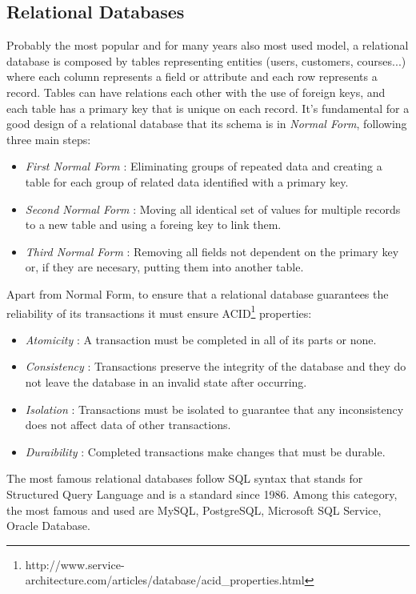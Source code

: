 \subsection{Relational Databases}
\label{sec:description}

Probably the most popular and for many years also most used model, a relational database is composed by tables representing entities (users, customers, courses...) where each column represents a field or attribute and each row represents a record.
Tables can have relations each other with the use of foreign keys, and each table has a primary key that is unique on each record.
It’s fundamental for a good design of a relational database that its schema is in \textit{Normal Form}, following three main steps:
\begin{itemize}
	\item \textit{First Normal Form} : Eliminating groups of repeated data and creating a table for each group of related data identified with a primary key.
	\item \textit{Second Normal Form} : Moving all identical set of values for multiple records to a new table and using a foreing key to link them.
	\item \textit{Third Normal Form} : Removing all fields not dependent on the primary key or, if they are necesary, putting them into another table.
\end{itemize}
Apart from Normal Form, to ensure that a relational database guarantees the reliability of its transactions it must ensure ACID\footnote{http://www.service-architecture.com/articles/database/acid\_properties.html} properties:
\begin{itemize}
	\item \textit{Atomicity} : A transaction must be completed in all of its parts or none.
	\item \textit{Consistency} : Transactions preserve the integrity of the database and they do not leave the database in an invalid state after occurring.
	\item \textit{Isolation} : Transactions must be isolated to guarantee that any inconsistency does not affect data of other transactions.
	\item \textit{Duraibility} : Completed transactions make changes that must be durable.
\end{itemize}
The most famous relational databases follow SQL syntax that stands for Structured Query Language and is a standard since 1986.
Among this category, the most famous and used are MySQL, PostgreSQL, Microsoft SQL Service, Oracle Database.
